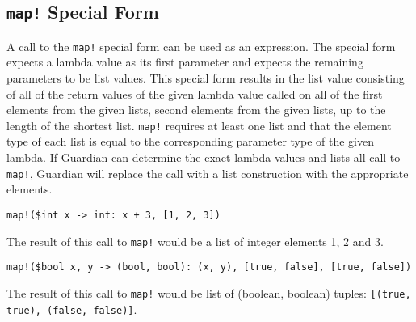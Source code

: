
\subsection{\texttt{map!} Special Form}
{
	A call to the \texttt{map!} special form can be used as an expression.
	The special form expects a lambda value as its
	first parameter and expects the remaining parameters to be list values.
	This special form results in the list value consisting
	of all of the return values of the given lambda value called on all of the
	first elements from the given lists, second elements from the given
	lists, up to the length of the shortest list.
	\texttt{map!} requires at least one list and that
	the element type of each list is equal to the corresponding parameter type
	of the given lambda.
	If Guardian can determine the exact lambda values and lists all call to
	\texttt{map!}, Guardian will replace the call with a list
	construction with the appropriate elements.
	
	\begin{itemize}
	{
		\item \texttt{map!(\$int x -> int: x + 3, [1, 2, 3])}
		
			The result of this call to \texttt{map!} would be a list of
			integer elements 1, 2 and 3.
		
		\item \texttt{map!(\$bool x, y -> (bool, bool): (x, y), [true, false], [true, false])}
		
			The result of this call to \texttt{map!} would be list of
			(boolean, boolean) tuples: \texttt{[(true, true), (false, false)]}.
	}
	\end{itemize}
}
